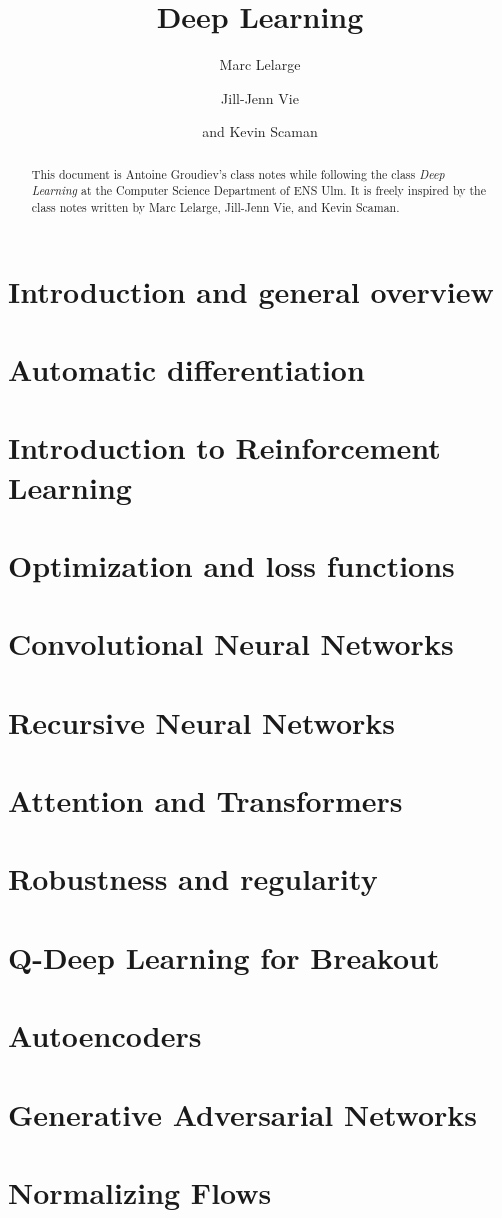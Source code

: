\documentclass[toc, titlepaged]{../cs-classes/cs-classes}
\title{Deep Learning}
\author{Marc Lelarge\and Jill-Jenn Vie\and and Kevin Scaman}
\begin{document}
\begin{abstract}
    This document is Antoine Groudiev's class notes while following the class \emph{Deep Learning} at the Computer Science Department of ENS Ulm. It is freely inspired by the class notes written by Marc Lelarge, Jill-Jenn Vie, and Kevin Scaman. 
\end{abstract}

\section{Introduction and general overview}

\section{Automatic differentiation}

\section{Introduction to Reinforcement Learning}

\section{Optimization and loss functions}

\section{Convolutional Neural Networks}

\section{Recursive Neural Networks}

\section{Attention and Transformers}

\section{Robustness and regularity}

\section{Q-Deep Learning for Breakout}

\section{Autoencoders}

\section{Generative Adversarial Networks}

\section{Normalizing Flows}
\end{document}
